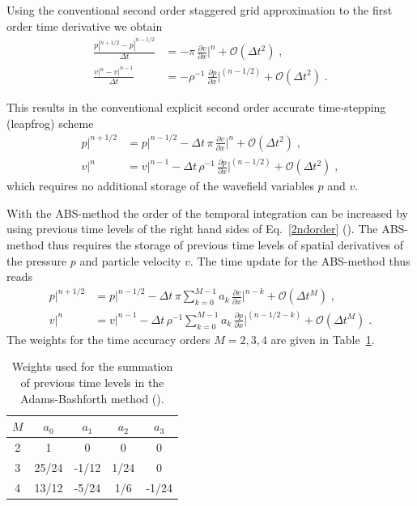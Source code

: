 Using the conventional second order staggered grid approximation to the first order time derivative we obtain
\begin{subequations}
    \begin{align}
    \frac{p |^{n+1/2}-p|^{n-1/2}}{\Delta t} &= - \pi\,\frac{\partial v}{\partial x}\bigg |^n  + \mathcal{O}(\Delta t^2)\;,\\ 
    \frac{v|^n-v|^{n-1}}{\Delta t} &= -\rho^{-1}\,\frac{\partial p}{\partial x}\bigg |^{(n-1/2)} + \mathcal{O}(\Delta t^2)\;.
    \label{2ndorder}
    \end{align}
\end{subequations}

This results in the conventional explicit second order accurate time-stepping (leapfrog) scheme
\begin{subequations}
    \begin{align}
        p|^{n+1/2} &= p|^{n-1/2} - \Delta t\,\pi\,\frac{\partial v}{\partial x}\bigg |^n  + \mathcal{O}(\Delta t^2)\;,\\
        v|^n &= v|^{n-1} -\Delta t\,\rho^{-1}\,\frac{\partial p}{\partial x}\bigg |^{(n-1/2)}  + \mathcal{O}(\Delta t^2)\;,
        \label{2ndorderexplicit}
    \end{align}
\end{subequations}
which requires no additional storage of the wavefield variables $p$ and $v$. 

With the ABS-method the order of the temporal integration  can be increased by using previous time levels of the right hand sides of Eq.~\ref{2ndorder} (\cite{ghrist2000staggered}). The ABS-method thus requires the storage of previous time levels of spatial derivatives of the pressure $p$ and particle velocity $v$. The time update for the ABS-method thus reads
\begin{subequations}
    \begin{align}
        p|^{n+1/2} &= p|^{n-1/2} - \Delta t\,\pi \sum_{k=0}^{M-1} a_k\,\frac{\partial v}{\partial x}\bigg |^{n-k}   + \mathcal{O}(\Delta t^M)\;,\\
        v|^n &= v|^{n-1} -\Delta t\,\rho^{-1}  \sum_{k=0}^{M-1} a_k\,\frac{\partial p}{\partial x}\bigg |^{(n-1/2-k)}  + \mathcal{O}(\Delta t^M)\;.
        \label{absmethod}
    \end{align}
\end{subequations}
The weights for the time accuracy orders $M=2,3,4$ are given in Table~\ref{absweights}. 
\begin{table}[ht]
    \centering
    \caption{\label{absweights}Weights used for the summation of previous time levels in the Adams-Bashforth method (\protect\cite{ghrist2000staggered}).}
    \begin{tabular}{c|c|c|c|c}
    $M$ & $a_0$ & $a_1$ & $a_2$ & $a_3$  \\ \hline
    2 & 1             &  0           &  0           &     0   \\
    3 &  25/24     &  -1/12         & 1/24   & 0   \\
    4 & 13/12      &  -5/24      &  1/6       &  -1/24     \\
    \end{tabular}
\end{table}

